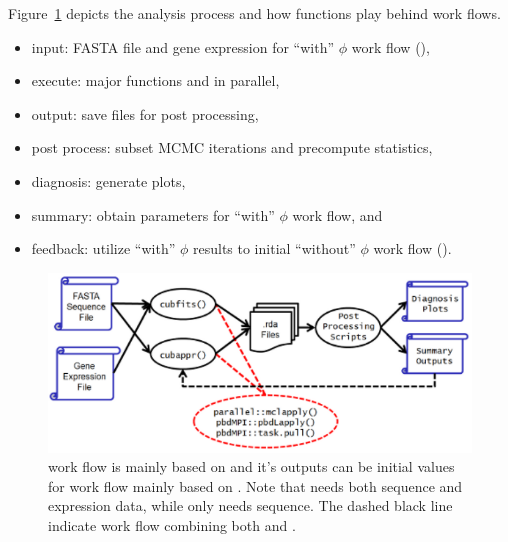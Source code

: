 Figure~\ref{fig:workflows} depicts the analysis process and how 
functions play behind work flows.
\begin{itemize}
\item
input: FASTA file and gene expression for
       ``with'' $\phi$ work flow (),
\item
execute: major functions  and  in parallel,
\item
output: save  files for post processing,
\item
post process: subset MCMC iterations and precompute statistics,
\item
diagnosis: generate plots,
\item
summary: obtain parameters for ``with'' $\phi$ work flow, and
\item
feedback: utilize ``with'' $\phi$ results to initial
          ``without'' $\phi$ work flow ().
\end{itemize}
\begin{figure}[ht]
\centering
\includegraphics[width=5.5in]{cubfits-include/figure/workflows}
\caption{ work flow is mainly based on  and it's
outputs can be initial values for  work flow mainly based on
. Note that  needs both sequence and expression
data, while  only needs sequence. The dashed black line indicate
 work flow combining both  and .
}
\label{fig:workflows}
\end{figure}

